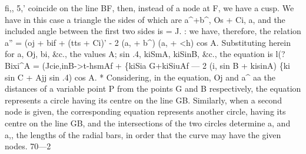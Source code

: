\documentclass[11pt,a4paper]{book}
\begin{document}
fi,,
5,' coincide on
the
line BF, then,
instead
of a node at
F, we have
a cusp.
We
have
in this
case
a
triangle
the
sides
of which
are a\textasciicircum{}+b\textasciicircum{},
Os + Ci,
a, and
the included angle between the
first two
sides
is = J.
: we have,
therefore, the relation
a'' = (oj + bif + (tts + Ci)' - 2 (a, + b\textasciicircum{}) (a, + <h) cos A.
Substituting
herein
for
a,
Oj,
bi,
\&c.,
the
values
A; sin .4,
kiSmA,
kiSinB,
\&c.,
the
equation
is
l(?Bixi\textasciicircum{}A = (Jcie,inB->t-hsmAf + \{kiSia G+kiSiuAf
--- 2 (i, sin B + kisinA) \{ki sin C + Ajj sin .4) cos A.
*
Considering,
in
the
equation,
Oj and
a\textasciicircum{} aa the distances of
a variable point P from the points G and B
respectively,
the
equation
represents
a
circle
having
its
centre
on
the
line
GB.
Similarly,
when
a
second
node
is
given,
the
corresponding
equation
represents
another
circle,
having
its
centre
on
the
line
GB,
and
the
intersections
of
the
two
circles
determine
a, and
a,,
the
lengths
of
the
radial
bars,
in
order
that
the
curve may have the given nodes.
70---2
\end{document}
